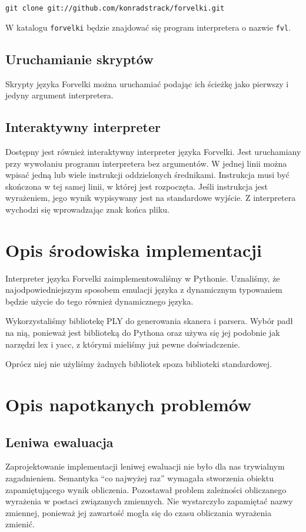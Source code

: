 \documentclass[4paper,10pt]{article}
\begin{document}
	\texttt{git clone git://github.com/konradstrack/forvelki.git}
	
	W katalogu \texttt{forvelki} będzie znajdować się program interpretera o nazwie \texttt{fvl}.
	
	\subsection{Uruchamianie skryptów}	
	Skrypty języka Forvelki można uruchamiać podając ich ścieżkę jako pierwszy i jedyny argument interpretera.	
	
	\subsection{Interaktywny interpreter}
	Dostępny jest również interaktywny interpreter języka Forvelki.
	Jest uruchamiany przy wywołaniu programu interpretera bez argumentów.
	W jednej linii można wpisać jedną lub wiele instrukcji oddzielonych średnikami.
	Instrukcja musi być skończona w tej samej linii, w której jest rozpoczęta.
	Jeśli instrukcja jest wyrażeniem, jego wynik wypisywany jest na standardowe wyjście.
	Z interpretera wychodzi się wprowadzając znak końca pliku.



\section{Opis środowiska implementacji}
	Interpreter języka Forvelki zaimplementowaliśmy w Pythonie.
	Uznaliśmy, że najodpowiedniejszym sposobem emulacji języka z dynamicznym typowaniem będzie użycie do tego również dynamicznego języka.
	
	Wykorzystaliśmy bibliotekę PLY do generowania skanera i parsera.
	Wybór padł na nią, ponieważ jest biblioteką do Pythona oraz używa się jej podobnie jak narzędzi lex i yacc, z którymi mieliśmy już pewne doświadczenie.
	
	Oprócz niej nie użyliśmy żadnych bibliotek spoza biblioteki standardowej.

\section{Opis napotkanych problemów}
	\subsection{Leniwa ewaluacja}
		Zaprojektowanie implementacji leniwej ewaluacji nie było dla nas trywialnym zagadnieniem.
		Semantyka ``co najwyżej raz'' wymagała stworzenia obiektu zapamiętującego wynik obliczenia.
		Pozostawał problem zależności obliczanego wyrażenia w postaci związanych zmiennych.
		Nie wystarczyło zapamiętać nazwy zmiennej, ponieważ jej zawartość mogła się do czasu obliczania wyrażenia zmienić.
\end{document}
